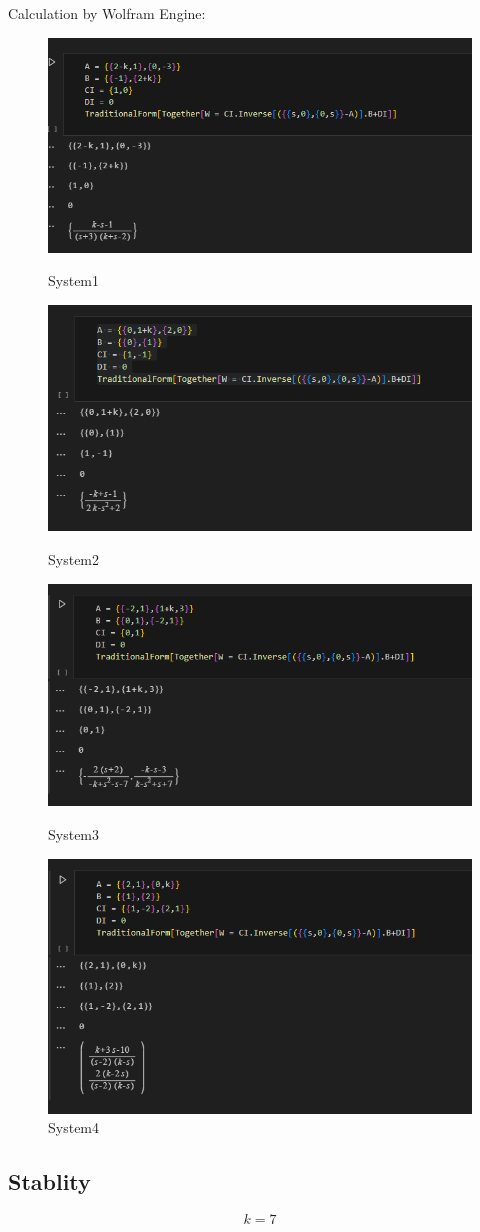 \documentclass[12pt,a4paper,oneside]{ctexart}
\begin{document}
    Calculation by Wolfram Engine:
    \begin{figure}[H]
        \includegraphics[width = 0.6\linewidth]{../screenshots/WCalcT1S1.PNG}
        \caption{System1}
        \includegraphics[width = 0.6\linewidth]{../screenshots/WCalcT1S2.PNG}
        \caption{System2}
        \includegraphics[width = 0.6\linewidth]{../screenshots/WCalcT1S3.PNG}
        \caption{System3}
        \includegraphics[width = 0.6\linewidth]{../screenshots/WCalcT1S4.PNG}
        \caption{System4}
    \end{figure}
    \newpage
    \subsection{Stablity}
    $$k = 7$$
\end{document}
